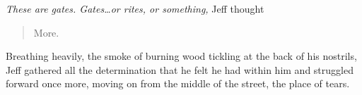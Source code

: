 \textit{These are gates.  Gates\ldots{}or rites, or something,} Jeff thought

\begin{quote}
  More.
\end{quote}

Breathing heavily, the smoke of burning wood tickling at the back of his nostrils, Jeff gathered all the determination that he felt he had within him and struggled forward once more, moving on from the middle of the street, the place of tears.

\secdiv





